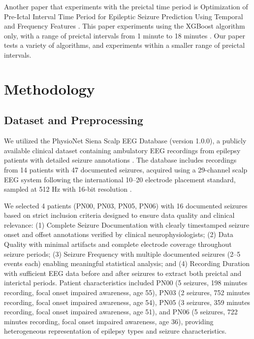 \documentclass[conference]{IEEEtran}
\begin{document}
Another paper that experiments with the preictal time period is Optimization of Pre-Ictal Interval Time Period for Epileptic Seizure Prediction Using Temporal and Frequency Features \cite{b12}. This paper experiments using the XGBoost algorithm only, with a range of preictal intervals from 1 minute to 18 minutes \cite{b12}. Our paper tests a variety of algorithms, and experiments within a smaller range of preictal intervals.

\section{Methodology}

\subsection{Dataset and Preprocessing}
We utilized the PhysioNet Siena Scalp EEG Database (version 1.0.0), a publicly available clinical dataset containing ambulatory EEG recordings from epilepsy patients with detailed seizure annotations \cite{b25}. The database includes recordings from 14 patients with 47 documented seizures, acquired using a 29-channel scalp EEG system following the international 10--20 electrode placement standard, sampled at 512 Hz with 16-bit resolution \cite{b25}.

We selected 4 patients (PN00, PN03, PN05, PN06) with 16 documented seizures based on strict inclusion criteria designed to ensure data quality and clinical relevance: (1) Complete Seizure Documentation with clearly timestamped seizure onset and offset annotations verified by clinical neurophysiologists; (2) Data Quality with minimal artifacts and complete electrode coverage throughout seizure periods; (3) Seizure Frequency with multiple documented seizures (2--5 events each) enabling meaningful statistical analysis; and (4) Recording Duration with sufficient EEG data before and after seizures to extract both preictal and interictal periods. Patient characteristics included PN00 (5 seizures, 198 minutes recording, focal onset impaired awareness, age 55), PN03 (2 seizures, 752 minutes recording, focal onset impaired awareness, age 54), PN05 (3 seizures, 359 minutes recording, focal onset impaired awareness, age 51), and PN06 (5 seizures, 722 minutes recording, focal onset impaired awareness, age 36), providing heterogeneous representation of epilepsy types and seizure characteristics.
\end{document}
